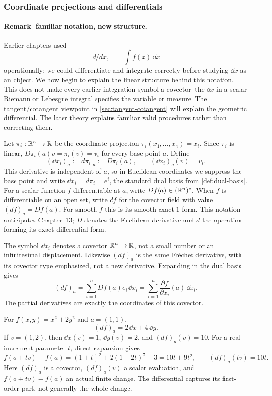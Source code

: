 \subsubsection*{Coordinate projections and differentials}
\paragraph{Remark: familiar notation, new structure.}
Earlier chapters used
\[
d/dx,\qquad \int f(x)\,\dd x
\]
 operationally:
we could differentiate and integrate correctly before studying $\dd x$
as an object. We now begin to explain the linear structure behind this
notation. This does not make every earlier integration symbol a covector;
the $\dd x$ in a scalar Riemann or Lebesgue integral specifies the variable
or measure. The tangent/cotangent viewpoint in
\cref{sec:tangent-cotangent} will explain the geometric differential.
The later theory explains familiar valid procedures rather than correcting them.

\begin{definition}
\label{def:coordinate-differentials}
Let $\pi_i:\mathbb{R}^n\to\mathbb{R}$ be the coordinate projection
$\pi_i(x_1,\ldots,x_n)=x_i$. Since $\pi_i$ is linear,
$D\pi_i(a)v=\pi_i(v)=v_i$ for every base point $a$. Define
\[
(\dd x_i)_a:=d\pi_i|_a:=D\pi_i(a),\qquad (\dd x_i)_a(v)=v_i.
\]
This derivative is independent of $a$, so in Euclidean coordinates we
suppress the base point and write $\dd x_i=d\pi_i=e^i$, the standard
dual basis from \cref{def:dual-basis}. For a scalar function $f$
differentiable at $a$, write $Df(a)\in(\mathbb{R}^n)^*$. When $f$ is differentiable
on an open set, write $df$ for the covector field with value $(df)_a=Df(a)$.
For smooth $f$ this is its smooth exact $1$-form.
This notation anticipates Chapter~13; $D$ denotes the Euclidean derivative
and $d$ the operation forming its exact differential form.
\end{definition}
The symbol $\dd x_i$ denotes a covector $\mathbb{R}^n\to\mathbb{R}$, not a small number
or an infinitesimal displacement. Likewise $(df)_a$ is the same Fr\'echet
derivative, with its covector type emphasized, not a new derivative.
Expanding in the dual basis gives
\[
\boxed{(df)_a=\sum_{i=1}^n Df(a)e_i\,\dd x_i
=\sum_{i=1}^n\frac{\partial f}{\partial x_i}(a)\,\dd x_i.}
\]
The partial derivatives are exactly the coordinates of this covector.
\begin{example}\label{ex:df-level-ellipse}
For $f(x,y)=x^2+2y^2$ and $a=(1,1)$,
\[
(df)_a=2\,\dd x+4\,\dd y.
\]
If $v=(1,2)$, then $\dd x(v)=1$, $\dd y(v)=2$, and $(df)_a(v)=10$.
For a real increment parameter $t$, direct expansion gives
\[
f(a+tv)-f(a)=(1+t)^2+2(1+2t)^2-3=10t+9t^2,
\qquad (df)_a(tv)=10t.
\]
Here $(df)_a$ is a covector, $(df)_a(v)$ a scalar evaluation, and
$f(a+tv)-f(a)$ an actual finite change. The differential captures its
first-order part, not generally the whole change.
\end{example}

